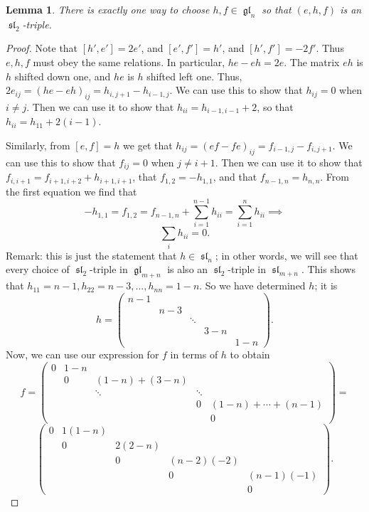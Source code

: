 \documentclass[12pt,psamsfonts]{article}
\DeclareMathOperator{\gl}{\mathfrak{gl}}
\DeclareMathOperator{\spl}{\mathfrak{sl}}
\newtheorem{lemma}[theorem]{Lemma}
\begin{document}
\begin{lemma}\label{simple_sl2_triple}
    There is exactly one way to choose \(h, f \in \gl_n\) so that \((e, h, f)\) is an \(\spl_2\)-triple.
\end{lemma}
\begin{proof}
    
Note that \([h', e'] = 2e'\), and \([e', f'] = h'\), and \([h', f'] = -2f'\).
Thus \(e, h, f\) must obey the same relations.
In particular, \(he - eh = 2e\).  
The matrix \(eh\) is \(h\) shifted down one, and \(he\) is \(h\) shifted left one.
Thus, \(2e_{ij} = (he - eh)_{ij} = h_{i, j + 1} - h_{i - 1, j}\).
We can use this to show that \(h_{ij} = 0\) when \(i \neq j\).
Then we can use it to show that \(h_{ii} = h_{i - 1, i - 1} + 2\), so that \(h_{ii} = h_{11} + 2(i - 1)\).
\par Similarly, from \([e, f] = h\) we get that \(h_{ij} = (ef - fe)_{ij} = f_{i - 1, j} - f_{i, j + 1}\).
We can use this to show that \(f_{ij} = 0\) when \(j \neq i + 1\).
Then we can use it to show that \(f_{i,i + 1} = f_{i + 1, i + 2} + h_{i + 1, i + 1}\), that \(f_{1,2} = -h_{1, 1}\), and that \(f_{n - 1, n} = h_{n,n}\).
From the first equation we find that
\[-h_{1,1} = f_{1, 2} = f_{n - 1, n} + \sum_{i = 1}^{n - 1} h_{ii} = \sum_{i = 1}^{n} h_{ii} \implies\]
\[\sum_i h_{ii} = 0.\]
Remark: this is just the statement that \(h \in \spl_n\); in other words, we will see that every choice of \(\spl_2\)-triple in \(\gl_{m + n}\) is also an \(\spl_2\)-triple in \(\spl_{m + n}\).
This shows that \(h_{11} = n - 1, h_{22} = n - 3, ..., h_{nn} = 1 - n\).
So we have determined \(h\); it is 
\[h = \begin{pmatrix}
    n - 1  & \\
    & n - 3 \\
    & & \ddots \\
    & & & 3 - n \\
    & & & & 1 - n 
\end{pmatrix}.\]
Now, we can use our expression for \(f\) in terms of \(h\) to obtain
\[f = \begin{pmatrix}
    0 & 1 - n \\
    & 0 & (1 - n) + (3 - n) \\
    & & \ddots & \ddots \\
    & & & 0 & (1 - n) + \cdots + (n - 1) \\
    & & & & 0
\end{pmatrix} = \]
\[\begin{pmatrix}
    0 & 1 (1 - n) \\
      & 0 & 2 (2 - n) \\
    & & 0 & (n - 2) (-2) \\
    & & & 0 & (n - 1) (-1)\\
    & &  & & 0
\end{pmatrix}.\]
\end{proof}
\end{document}
